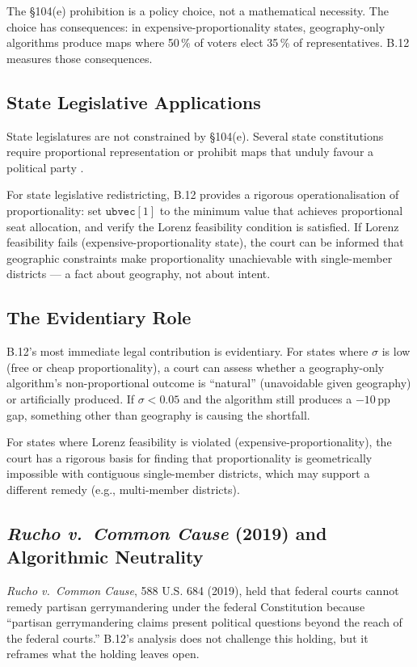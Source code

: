 The \S104(e) prohibition is a policy choice, not a mathematical necessity.
The choice has consequences: in expensive-proportionality states, geography-only
algorithms produce maps where 50\,\% of voters elect 35\,\% of representatives.
B.12 measures those consequences.

\subsection{State Legislative Applications}

State legislatures are not constrained by \S104(e).
Several state constitutions require proportional representation or prohibit
maps that unduly favour a political party \citep{lwv2018pa, harper2022nc}.

For state legislative redistricting, B.12 provides a rigorous operationalisation
of proportionality: set $\mathtt{ubvec}[1]$ to the minimum value that achieves
proportional seat allocation, and verify the Lorenz feasibility condition is
satisfied.
If Lorenz feasibility fails (expensive-proportionality state), the court can
be informed that geographic constraints make proportionality unachievable
with single-member districts --- a fact about geography, not about intent.

\subsection{The Evidentiary Role}

B.12's most immediate legal contribution is evidentiary.
For states where $\sigma$ is low (free or cheap proportionality), a court
can assess whether a geography-only algorithm's non-proportional outcome is
``natural'' (unavoidable given geography) or artificially produced.
If $\sigma < 0.05$ and the algorithm still produces a $-10$\,pp gap,
something other than geography is causing the shortfall.

For states where Lorenz feasibility is violated (expensive-proportionality),
the court has a rigorous basis for finding that proportionality is geometrically
impossible with contiguous single-member districts, which may support a
different remedy (e.g., multi-member districts).

\subsection{\emph{Rucho v.\ Common Cause} (2019) and Algorithmic Neutrality}

\emph{Rucho v.\ Common Cause}, 588 U.S. 684 (2019), held that federal courts
cannot remedy partisan gerrymandering under the federal Constitution because
``partisan gerrymandering claims present political questions beyond the reach
of the federal courts.''
B.12's analysis does not challenge this holding, but it reframes what the
holding leaves open.

